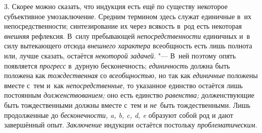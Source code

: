 3. Скорее можно сказать, что индукция есть ещё по существу
некоторое субъективное умозаключение. Средним термином здесь служат
единичные в~их непосредственности; синтезирование их через всякость в~род
есть некоторая {\em внешняя}
рефлексия. В~силу пребывающей
{\em непосредственности}
единичных и~в силу вытекающего отсюда
{\em внешнего характера}
всеобщность есть лишь полнота или, лучше
сказать, остаётся {\em некоторой
задачей}. "--- В~ней поэтому опять появляется
{\em прогресс} в~дурную
бесконечность; {\em единичность}
должна быть положена как
{\em тождественная} со
{\em всеобщностью,} но
так как {\em единичные}
положены вместе с~тем и~как
{\em непосредственные,}
то указанное единство остаётся лишь постоянным
{\em долженствованием;}
оно есть единство
{\em равенства;}
долженствующие быть тождественными должны вместе с~тем и
{\em не}~быть
тождественными. Лишь продолженные до
{\em бесконечности,}
{\em a, b, c, d, e} образуют собой род и
дают завершённый опыт. {\em Заключение}
индукции остаётся постольку
{\em проблематическим}.

